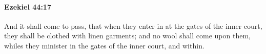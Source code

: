 
		\paragraph{Ezekiel 44:17} %
			\label{EZEKIEL-44-17}

			And it shall come to pass, that when they enter in at the gates of the inner court, they shall be clothed with linen garments; and no wool shall come upon them, whiles they minister in the gates of the inner court, and within.


